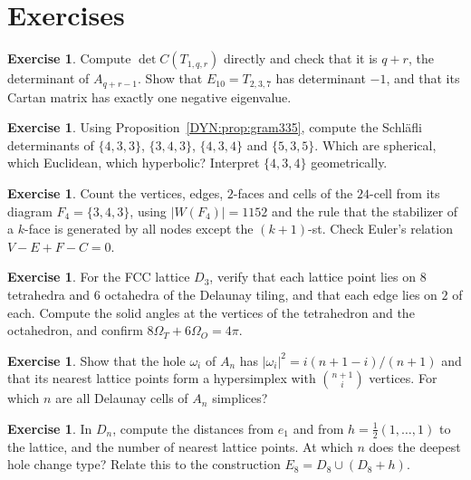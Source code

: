 \documentclass[11pt,openany]{book}
\theoremstyle{plain}
\theoremstyle{definition}
\newtheorem{exercise}[theorem]{Exercise}
\theoremstyle{remark}
\newcommand{\abs}[1]{\left\lvert #1 \right\rvert}
\begin{document}
\section*{Exercises}

\begin{exercise}
Compute $\det C(T_{1,q,r})$ directly and check that it is $q+r$, the determinant of $A_{q+r-1}$. Show that
$E_{10}=T_{2,3,7}$ has determinant $-1$, and that its Cartan matrix has exactly one negative eigenvalue.
\end{exercise}

\begin{exercise}
Using Proposition~\ref{DYN:prop:gram335}, compute the Schl\"afli determinants of $\{4,3,3\}$, $\{3,4,3\}$,
$\{4,3,4\}$ and $\{5,3,5\}$. Which are spherical, which Euclidean, which hyperbolic? Interpret
$\{4,3,4\}$ geometrically.
\end{exercise}

\begin{exercise}
Count the vertices, edges, $2$-faces and cells of the $24$-cell from its diagram $F_4=\{3,4,3\}$, using
$\abs{W(F_4)}=1152$ and the rule that the stabilizer of a $k$-face is generated by all nodes except the
$(k+1)$-st. Check Euler's relation $V-E+F-C=0$.
\end{exercise}

\begin{exercise}
For the FCC lattice $D_3$, verify that each lattice point lies on $8$ tetrahedra and $6$ octahedra of the
Delaunay tiling, and that each edge lies on $2$ of each. Compute the solid angles at the vertices of the
tetrahedron and the octahedron, and confirm $8\Omega_T+6\Omega_O=4\pi$.
\end{exercise}

\begin{exercise}
Show that the hole $\omega_i$ of $A_n$ has $\abs{\omega_i}^2=i(n+1-i)/(n+1)$ and that its nearest lattice
points form a hypersimplex with $\binom{n+1}i$ vertices. For which $n$ are all Delaunay cells of $A_n$
simplices?
\end{exercise}

\begin{exercise}
In $D_n$, compute the distances from $e_1$ and from $h=\frac12(1,\dots,1)$ to the lattice, and the number of
nearest lattice points. At which $n$ does the deepest hole change type? Relate this to the construction
$E_8=D_8\cup(D_8+h)$.
\end{exercise}
\end{document}
